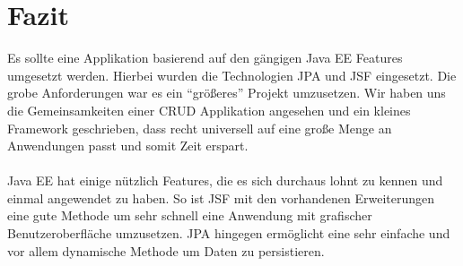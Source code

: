 \chapter{Fazit}

Es sollte eine Applikation basierend auf den gängigen Java EE Features umgesetzt werden.
Hierbei wurden die Technologien \ac{JPA} und \acs{JSF} eingesetzt. Die grobe Anforderungen war es ein \enquote{größeres} Projekt umzusetzen.
Wir haben uns die Gemeinsamkeiten einer \acs{CRUD} Applikation angesehen und ein kleines Framework geschrieben, dass recht universell
auf eine große Menge an Anwendungen passt und somit Zeit erspart.\\
\\
Java EE hat einige nützlich Features, die es sich durchaus lohnt zu kennen und einmal angewendet zu haben. So ist \acs{JSF} mit den vorhandenen Erweiterungen
eine gute Methode um sehr schnell eine Anwendung mit grafischer Benutzeroberfläche umzusetzen. \acs{JPA} hingegen ermöglicht eine sehr einfache und vor allem
dynamische Methode um Daten zu persistieren. 
